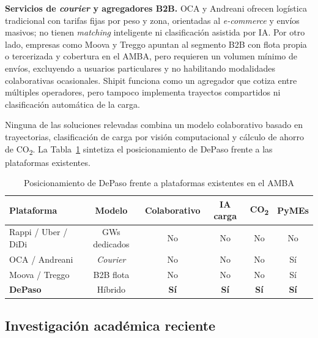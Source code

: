 \textbf{Servicios de \emph{courier} y agregadores B2B.} OCA y Andreani ofrecen logística tradicional con tarifas fijas por peso y zona, orientadas al \emph{e-commerce} y envíos masivos; no tienen \emph{matching} inteligente ni clasificación asistida por IA. Por otro lado, empresas como Moova y Treggo apuntan al segmento B2B con flota propia o tercerizada y cobertura en el AMBA, pero requieren un volumen mínimo de envíos, excluyendo a usuarios particulares y no habilitando modalidades colaborativas ocasionales. Shipit funciona como un agregador que cotiza entre múltiples operadores, pero tampoco implementa trayectos compartidos ni clasificación automática de la carga.

Ninguna de las soluciones relevadas combina un modelo colaborativo basado en trayectorias, clasificación de carga por visión computacional y cálculo de ahorro de CO\textsubscript{2}. La Tabla~\ref{tab:comparativa} sintetiza el posicionamiento de DePaso frente a las plataformas existentes.

\begin{table}[H]
    \caption{Posicionamiento de DePaso frente a plataformas existentes en el AMBA}
    \label{tab:comparativa}
    \centering
    \small
    \begin{tabular}{lccccc}
        \toprule
        \textbf{Plataforma} & \textbf{Modelo} & \textbf{Colaborativo} & \textbf{IA carga} & \textbf{CO\textsubscript{2}} & \textbf{PyMEs} \\
        \midrule
        Rappi / Uber / DiDi    & GWs dedicados & No  & No  & No  & No  \\
        OCA / Andreani         & \emph{Courier} & No  & No  & No  & Sí  \\
        Moova / Treggo         & B2B flota      & No  & No  & No  & Sí  \\
        \midrule
        \textbf{DePaso}        & Híbrido        & \textbf{Sí} & \textbf{Sí} & \textbf{Sí} & \textbf{Sí} \\
        \bottomrule
    \end{tabular}
\end{table}

\subsection{Investigación académica reciente}

